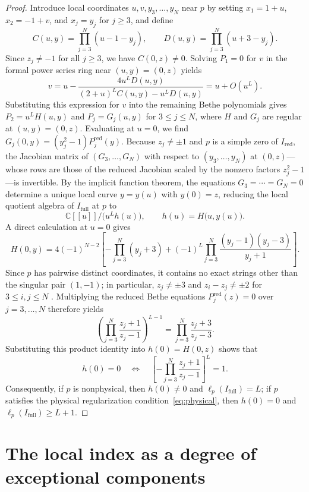 \documentclass[11pt]{article}
\theoremstyle{definition}
\newcommand{\C}{\mathbb{C}}
\begin{document}
\begin{proof}
	Introduce local coordinates $u,v,y_3,\ldots,y_N$ near $p$ by setting $x_1=1+u$, $x_2=-1+v$, and $x_j=y_j$ for $j\ge 3$, and define
    \[
    C(u,y)=\prod_{j=3}^N(u-1-y_j),\qquad
    D(u,y)=\prod_{j=3}^N(u+3-y_j).
    \]
    Since $z_j\ne -1$ for all $j\ge 3$, we have $C(0,z)\ne 0$. Solving $P_1=0$ for $v$ in the formal power series ring near $(u,y)=(0,z)$ yields
    \[
    v=u-\frac{4u^L D(u,y)}{(2+u)^L C(u,y)-u^L D(u,y)}
      =u+O(u^L).
    \]
    Substituting this expression for $v$ into the remaining Bethe polynomials gives $P_2=u^L H(u,y)$ and
    $P_j=G_j(u,y)$ for $3\le j\le N$, where $H$ and $G_j$ are regular
    at $(u,y)=(0,z)$. Evaluating at $u=0$, we find
    $G_j(0,y)=(y_j^2-1)P_j^{\mathrm{red}}(y)$. Because $z_j\ne\pm 1$ and $p$ is a simple zero of $I_{\mathrm{red}}$, the Jacobian matrix of
	$(G_3,\ldots,G_N)$ with respect to $(y_3,\ldots,y_N)$ at $(0,z)$---whose rows are those of the reduced Jacobian scaled by the nonzero factors $z_j^2-1$---is invertible. By the implicit function theorem, the equations $G_3=\cdots=G_N=0$ determine a
	unique local curve $y=y(u)$ with $y(0)=z$, reducing the local quotient algebra of $I_{\mathrm{full}}$ at $p$ to
	\[
	\C[[u]]/\bigl(u^L h(u)\bigr),\qquad h(u)=H\bigl(u,y(u)\bigr).
	\]
	A direct calculation at $u=0$ gives
    \[
    H(0,y)=4(-1)^{N-2}\left[
    -\prod_{j=3}^N(y_j+3)
    +(-1)^L\prod_{j=3}^N\frac{(y_j-1)(y_j-3)}{y_j+1}
    \right].
    \]
    Since $p$ has pairwise distinct coordinates, it contains no exact strings other than
    the singular pair $(1,-1)$; in particular, $z_j\ne\pm 3$ and
    $z_i-z_j\ne\pm 2$ for $3\le i,j\le N$ \cite[Lemma~1]{GJ2020}. Multiplying the reduced Bethe equations $P_j^{\mathrm{red}}(z)=0$ over $j=3,\ldots,N$
    therefore yields
    \[
    \left(\prod_{j=3}^N\frac{z_j+1}{z_j-1}\right)^{L-1}
    =\prod_{j=3}^N\frac{z_j+3}{z_j-3}.
    \]
    Substituting this product identity into $h(0)=H(0,z)$ shows that
    \begin{equation}\label{eq:one-pair-compatibility}
    h(0)=0\quad\Longleftrightarrow\quad
    \left[-\prod_{j=3}^N\frac{z_j+1}{z_j-1}\right]^L=1.
    \end{equation}
    Consequently, if $p$ is nonphysical, then $h(0)\ne 0$ and $\ell_p(I_{\mathrm{full}})=L$;
    if $p$ satisfies the physical regularization condition~\eqref{eq:physical}, then $h(0)=0$ and $\ell_p(I_{\mathrm{full}})\ge L+1$.
\end{proof}


\section{The local index as a degree of exceptional components}
\label{sec:residual-local-index}
\end{document}
